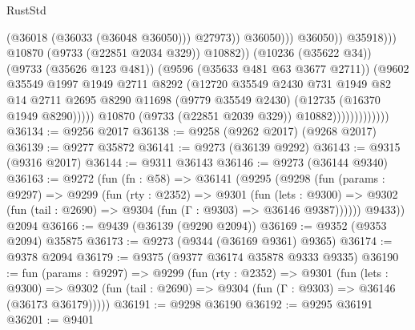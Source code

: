 \begin{lexlean}{RustStd}
\begin{coremodule}
{\begin{coremodule}
{{{{{{{{{{{{{{{{{{{{{{{{{{{{{{{{{{{{{{{{{{{{{{{{{{{{{{{                                                        (@36018 (@36033 (@36048 @36050)))
                                                        @27973))
                                                    @36050)))
                                              @36050))
                                          @35918)))
                                    @10870
                                    (@9733 (@22851 @2034 @329))
                                    @10882))
                                (@10236 (@35622 @34))
                                (@9733 (@35626 @123 @481))
                                (@9596 (@35633 @481 @63 @3677 @2711))
                                (@9602
                                  @35549
                                  @1997
                                  @1949
                                  @2711
                                  @8292
                                  (@12720
                                    @35549
                                    @2430
                                    @731
                                    @1949
                                    @82
                                    @14
                                    @2711
                                    @2695
                                    @8290
                                    @11698
                                    (@9779 @35549 @2430)
                                    (@12735 (@16370 @1949 @8290)))))
                              @10870
                              (@9733 (@22851 @2039 @329))
                              @10882)))))))))))))
@36134 := @9256 @2017
@36138 := @9258 (@9262 @2017) (@9268 @2017)
@36139 := @9277 @35872
@36141 := @9273 (@36139 @9292)
@36143 := @9315 (@9316 @2017)
@36144 := @9311 @36143
@36146 := @9273 (@36144 @9340)
@36163 := @9272
    (fun (fn : @58) =>
    @36141
      (@9295
        (@9298
          (fun (params : @9297) =>
          @9299
            (fun (rty : @2352) =>
            @9301
              (fun (lets : @9300) =>
              @9302 (fun (tail : @2690) => @9304 (fun (Γ : @9303) => @36146 @9387))))))
        @9433))
    @2094
@36166 := @9439 (@36139 (@9290 @2094))
@36169 := @9352 (@9353 @2094) @35875
@36173 := @9273 (@9344 (@36169 @9361) @9365)
@36174 := @9378 @2094
@36179 := @9375 (@9377 @36174 @35878 @9333 @9335)
@36190 := fun (params : @9297) =>
  @9299
    (fun (rty : @2352) =>
    @9301
      (fun (lets : @9300) =>
      @9302 (fun (tail : @2690) => @9304 (fun (Γ : @9303) => @36146 (@36173 @36179)))))
@36191 := @9298 @36190
@36192 := @9295 @36191
@36201 := @9401
}}}}}}}}}}}}}}}}}}}}}}}}}}}}}}}}}}}}}}}}}}}}}}}}}}}}}}}
\end{coremodule}}
\end{coremodule}
\end{lexlean}
